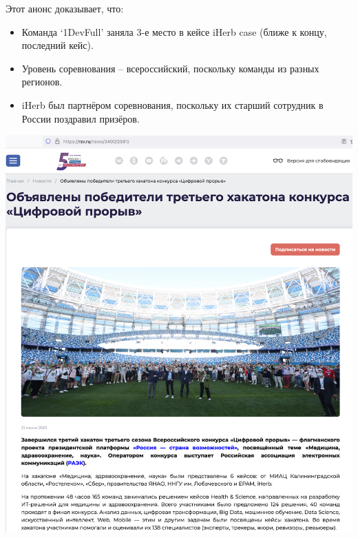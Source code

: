 
Этот анонс доказывает, что:

\begin{itemize}
    \item Команда `1DevFull' заняла 3-е место в кейсе iHerb case (ближе к концу, последний кейс).
    \item Уровень соревнования -- всероссийский, поскольку команды из разных регионов.
    \item iHerb был партнёром соревнования, поскольку их старший сотрудник в России поздравил призёров.
\end{itemize}



\begin{center}
    \includegraphics[width=40em]{rsv-news-p1}
\end{center}
\WillContinue
\pagebreak

